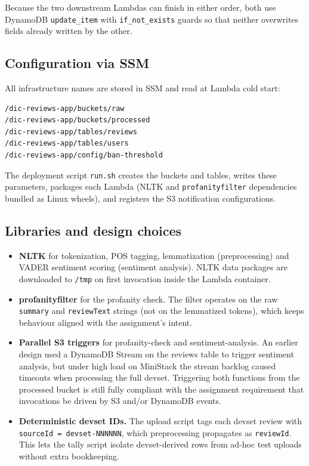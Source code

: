 \documentclass[11pt,a4paper]{article}
\begin{document}
Because the two downstream Lambdas can finish in either order, both use
DynamoDB \texttt{update\_item} with \texttt{if\_not\_exists} guards so
that neither overwrites fields already written by the other.

\subsection{Configuration via SSM}

All infrastructure names are stored in SSM and read at Lambda cold
start:

\begin{lstlisting}[caption={SSM parameters used by the application}]
/dic-reviews-app/buckets/raw
/dic-reviews-app/buckets/processed
/dic-reviews-app/tables/reviews
/dic-reviews-app/tables/users
/dic-reviews-app/config/ban-threshold
\end{lstlisting}

The deployment script \texttt{run.sh} creates the buckets and tables,
writes these parameters, packages each Lambda (NLTK and
\texttt{profanityfilter} dependencies bundled as Linux wheels), and
registers the S3 notification configurations.

\subsection{Libraries and design choices}

\begin{itemize}
    \item \textbf{NLTK} for tokenization, POS tagging, lemmatization
          (preprocessing) and VADER sentiment scoring (sentiment
          analysis). NLTK data packages are downloaded to \texttt{/tmp}
          on first invocation inside the Lambda container.
    \item \textbf{profanityfilter} for the profanity check. The filter
          operates on the raw \texttt{summary} and \texttt{reviewText}
          strings (not on the lemmatized tokens), which keeps behaviour
          aligned with the assignment's intent.
    \item \textbf{Parallel S3 triggers} for profanity-check and
          sentiment-analysis. An earlier design used a DynamoDB Stream
          on the reviews table to trigger sentiment analysis, but under
          high load on MiniStack the stream backlog caused timeouts when
          processing the full devset. Triggering both functions from the
          processed bucket is still fully compliant with the assignment
          requirement that invocations be driven by S3 and/or DynamoDB
          events.
    \item \textbf{Deterministic devset IDs.} The upload script tags each
          devset review with \texttt{sourceId = devset-NNNNNN}, which
          preprocessing propagates as \texttt{reviewId}. This lets the
          tally script isolate devset-derived rows from ad-hoc test
          uploads without extra bookkeeping.
\end{itemize}
\end{document}
